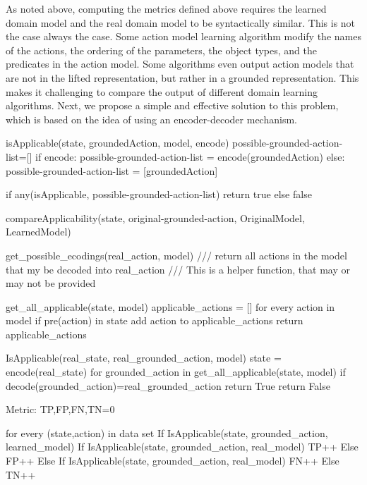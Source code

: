 As noted above, computing the metrics defined above requires the learned domain model and the real domain model to be syntactically similar. This is not the case always the case. 
Some action model learning algorithm modify the names of the actions, the ordering of the parameters, the object types, and the predicates in the action model. 
Some algorithms even output action models that are not in the lifted representation, but rather in a grounded representation. 
This makes it challenging to compare the output of different domain learning algorithms. 
Next, we propose a simple and effective solution to this problem, which is based on the idea of using an encoder-decoder mechanism. 




isApplicable(state, groundedAction, model, encode)
possible-grounded-action-list=[]
if encode:
    possible-grounded-action-list = encode(groundedAction)  
else:
     possible-grounded-action-list = [groundedAction]

if any(isApplicable, possible-grounded-action-list) return true
else false


compareApplicability(state, original-grounded-action, OriginalModel, LearnedModel)

    
get\_possible\_ecodings(real\_action, model) 
/// return all actions in the model that my be decoded into real\_action
/// This is a helper function, that may or may not be provided

get\_all\_applicable(state, model)
    applicable\_actions = []
    for every action in model
        if pre(action) in state
            add action to applicable\_actions
    return applicable\_actions
    
        
IsApplicable(real\_state, real\_grounded\_action, model) 
    state = encode(real\_state)
    for grounded\_action in get\_all\_applicable(state, model)  
        if decode(grounded\_action)=real\_grounded\_action 
            return True
    return False

Metric:
    TP,FP,FN,TN=0

    for every (state,action) in data set    
        If IsApplicable(state, grounded\_action, learned\_model)
            If IsApplicable(state, grounded\_action, real\_model)
                TP++
            Else
                FP++
        Else
            If IsApplicable(state, grounded\_action, real\_model)
                FN++
            Else
                TN++
    

    
